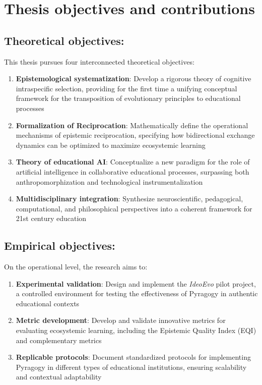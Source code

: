 \newpage
\section{Thesis objectives and contributions}
\subsection*{Theoretical objectives:}

This thesis pursues four interconnected theoretical objectives:

\begin{enumerate}
	\item \textbf{Epistemological systematization}: Develop a rigorous theory of cognitive intraspecific selection, providing for the first time a unifying conceptual framework for the transposition of evolutionary principles to educational processes
	
	\item \textbf{Formalization of Reciprocation}: Mathematically define the operational mechanisms of epistemic reciprocation, specifying how bidirectional exchange dynamics can be optimized to maximize ecosystemic learning
	
	\item \textbf{Theory of educational AI}: Conceptualize a new paradigm for the role of artificial intelligence in collaborative educational processes, surpassing both anthropomorphization and technological instrumentalization
	
	\item \textbf{Multidisciplinary integration}: Synthesize neuroscientific, pedagogical, computational, and philosophical perspectives into a coherent framework for 21st century education
\end{enumerate}

\subsection{Empirical objectives:}

On the operational level, the research aims to:

\begin{enumerate}
	\item \textbf{Experimental validation}: Design and implement the \textit{IdeoEvo} pilot project, a controlled environment for testing the effectiveness of Pyragogy in authentic educational contexts
	
	\item \textbf{Metric development}: Develop and validate innovative metrics for evaluating ecosystemic learning, including the Epistemic Quality Index (EQI) and complementary metrics
	
	\item \textbf{Replicable protocols}: Document standardized protocols for implementing Pyragogy in different types of educational institutions, ensuring scalability and contextual adaptability
\end{enumerate}


